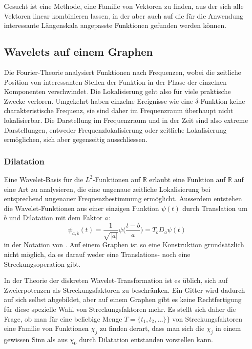Gesucht ist eine Methode, eine Familie von Vektoren zu finden,
aus der sich alle Vektoren linear kombinieren lassen, in der aber
auch auf die für die Anwendung interessante Längenskala angepasste
Funktionen gefunden werden können.

\subsection{Wavelets auf einem Graphen}
Die Fourier-Theorie analysiert Funktionen nach Frequenzen, wobei die 
zeitliche Position von interessanten Stellen der Funktion in der Phase
der einzelnen Komponenten verschwindet.
Die Lokalisierung geht also für viele praktische Zwecke verloren.
Umgekehrt haben einzelne Ereignisse wie eine $\delta$-Funktion keine
charakteristische Frequenz, sie sind daher im Frequenzraum überhaupt 
nicht lokalisierbar.
Die Darstellung im Frequenzraum und in der Zeit sind also extreme
Darstellungen, entweder Frequenzlokalisierung oder zeitliche Lokalisierung
ermöglichen, sich aber gegenseitig ausschliessen.

\subsubsection{Dilatation}
Eine Wavelet-Basis für die $L^2$-Funktionen auf $\mathbb{R}$ erlaubt
eine Funktion auf $\mathbb{R}$ auf eine Art zu analysieren, die eine
ungenaue zeitliche Lokalisierung bei entsprechend ungenauer
Frequenzbestimmung ermöglicht.
Ausserdem entstehen die Wavelet-Funktionen aus einer einzigen Funktion
$\psi(t)$ durch Translation um $b$ und Dilatation mit dem Faktor $a$:
\[
\psi_{a,b}(t)
=
\frac{1}{\sqrt{|a|}} \psi\biggl(\frac{t-b}a\biggr)
=
T_bD_a\psi(t)
\]
in der Notation von \cite{buch:mathsem-wavelets}.
Auf einem Graphen ist so eine Konstruktion grundsätzlich nicht möglich,
da es darauf weder eine Translations- noch eine Streckungsoperation gibt.

In der Theorie der diskreten Wavelet-Transformation ist es üblich, sich
auf Zweierpotenzen als Streckungsfaktoren zu beschränken.
Ein Gitter wird dadurch auf sich selbst abgebildet, aber auf einem
Graphen gibt es keine Rechtfertigung für diese spezielle Wahl von
Streckungsfaktoren mehr.
Es stellt sich daher die Frage, ob man für eine beliebige Menge
\(
T= \{ t_1,t_2,\dots\} \}
\)
von Streckungsfaktoren eine Familie von Funktionen $\chi_j$ zu finden
derart, dass man sich die $\chi_j$ in einem gewissen Sinn als aus
$\chi_0$ durch Dilatation entstanden vorstellen kann.

